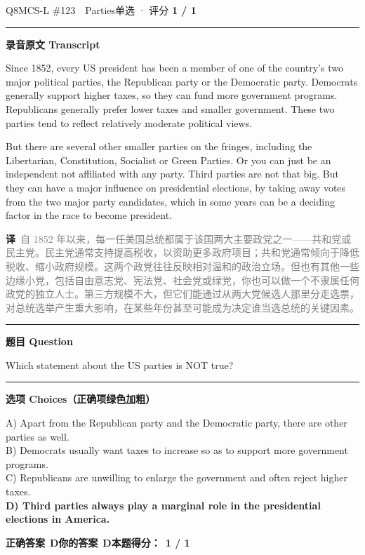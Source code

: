 \documentclass[11pt]{article}
\newcommand{\ptesub}[1]{%
  \par\needspace{2\baselineskip}\smallskip
  {\color{cAccent}\rule[-0.2ex]{3pt}{1.05em}}\hspace{6pt}%
  {\bfseries\color{cHead}#1}\par\nopagebreak\smallskip}
\newcommand{\zh}[1]{{\footnotesize\textcolor{cNote}{\textbf{译}}\ \textcolor{gray}{#1}}}
\begin{document}
\begin{qblock}{Q8\quad MCS-L \#123\ \ Parties}{单选 · 评分 \textcolor{cAccent}{\bfseries 1 / 1}}
\ptesub{录音原文 Transcript}
\begin{promptbox}
Since 1852, every US president has been a member of one of the country's two major political parties, the Republican party or the Democratic party. Democrats generally support higher taxes, so they can fund more government programs. Republicans generally prefer lower taxes and smaller government. These two parties tend to reflect relatively moderate political views.

But there are several other smaller parties on the fringes, including the Libertarian, Constitution, Socialist or Green Parties. Or you can just be an independent not affiliated with any party. Third parties are not that big. But they can have a major influence on presidential elections, by taking away votes from the two major party candidates, which in some years can be a deciding factor in the race to become president.
\end{promptbox}
\zh{自 1852 年以来，每一任美国总统都属于该国两大主要政党之一——共和党或民主党。民主党通常支持提高税收，以资助更多政府项目；共和党通常倾向于降低税收、缩小政府规模。这两个政党往往反映相对温和的政治立场。但也有其他一些边缘小党，包括自由意志党、宪法党、社会党或绿党，你也可以做一个不隶属任何政党的独立人士。第三方规模不大，但它们能通过从两大党候选人那里分走选票，对总统选举产生重大影响，在某些年份甚至可能成为决定谁当选总统的关键因素。}
\ptesub{题目 Question}
\begin{notebox}Which statement about the US parties is NOT true?\end{notebox}
\ptesub{选项 Choices（正确项绿色加粗）}
{\small
A) Apart from the Republican party and the Democratic party, there are other parties as well.\\
B) Democrats usually want taxes to increase so as to support more government programs.\\
C) Republicans are unwilling to enlarge the government and often reject higher taxes.\\
{\color{cFix}\textbf{D) Third parties always play a marginal role in the presidential elections in America.}}}
\par\smallskip
\textbf{正确答案}\ \textcolor{cFix}{\bfseries D}\qquad\textbf{你的答案}\ \textcolor{cFix}{\bfseries D}\qquad\textbf{本题得分：}\ {\color{cAccent}\bfseries 1 / 1}
\end{qblock}
\end{document}
